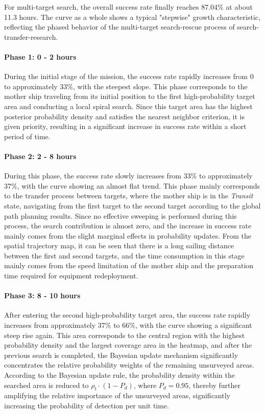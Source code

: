 \documentclass{mcmthesis}
\begin{document}
For multi-target search,
the overall success rate finally reaches 87.04\% at about 11.3 hours.
The curve as a whole shows a typical "stepwise" growth characteristic,
reflecting the phased behavior of the multi-target search-rescue process of search-transfer-research.

\paragraph{\textbf{Phase 1: 0 - 2 hours}}
During the initial stage of the mission,
the success rate rapidly increases from 0 to approximately 33\%,
with the steepest slope.
This phase corresponds to the mother ship traveling from its initial position to the first high-probability target area and conducting a local spiral search.
Since this target area has the highest posterior probability density
and satisfies the nearest neighbor criterion,
it is given priority,
resulting in a significant increase in success rate within a short period of time.

\paragraph{\textbf{Phase 2: 2 - 8 hours}}
During this phase,
the success rate slowly increases from 33\% to approximately 37\%,
with the curve showing an almost flat trend.
This phase mainly corresponds to the transfer process between targets,
where the mother ship is in the \textit{Transit} state,
navigating from the first target to the second target according to the global path planning results.
Since no effective sweeping is performed during this process,
the search contribution is almost zero,
and the increase in success rate mainly comes from the slight marginal effects in probability updates.
From the spatial trajectory map, it can be seen that
there is a long sailing distance between the first and second targets,
and the time consumption in this stage mainly comes from the speed limitation of the mother ship and the preparation time required for equipment redeployment.

\paragraph{\textbf{Phase 3: 8 - 10 hours}}
After entering the second high-probability target area,
the success rate rapidly increases from approximately 37\% to 66\%,
with the curve showing a significant steep rise again.
This area corresponds to the central region with the highest probability density and the largest coverage area in the heatmap,
and after the previous search is completed,
the Bayesian update mechanism significantly concentrates the relative probability weights of the remaining unsurveyed areas.
According to the Bayesian update rule,
the probability density within the searched area is reduced to
$\rho_t \cdot (1-P_d)$,
where $P_d = 0.95$,
thereby further amplifying the relative importance of the unsurveyed areas,
significantly increasing the probability of detection per unit time.
\end{document}
